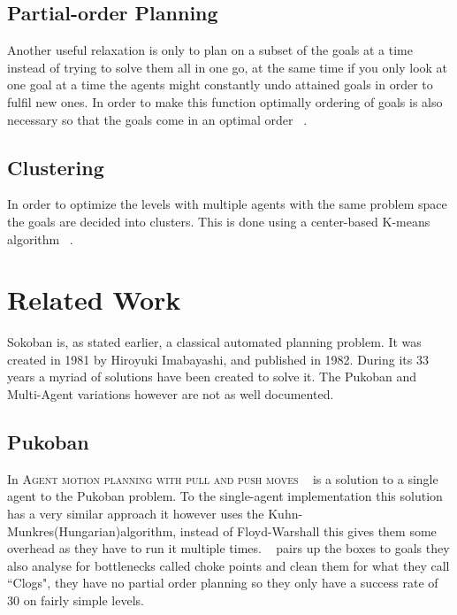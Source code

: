 \documentclass[letterpaper]{article}
\begin{document}
	\subsection{Partial-order Planning}
		Another useful relaxation is only to plan on a subset of the goals at a time instead of trying to solve them all in one go, at the same time if you only look at one goal at a time the agents might constantly undo attained goals in order to fulfil new ones. In order to make this function optimally ordering of goals is also necessary so that the goals come in an optimal order ~\cite{Subgoals}.
	\subsection{Clustering}
		In order to optimize the levels with multiple agents with the same problem space the goals are decided into clusters. This is done using a center-based K-means algorithm ~\cite{K-Means}.
		
\section{Related Work}
	Sokoban is, as stated earlier, a classical automated planning problem. It was created in 1981 by Hiroyuki Imabayashi, and published in 1982. During its 33 years a myriad of solutions have been created to solve it.
	The Pukoban and Multi-Agent variations however are not as well documented.
	\subsection{Pukoban}
		In \textsc{Agent motion planning with pull and push moves} ~\cite{Pukoban} is a solution to a single agent to the Pukoban problem. To the single-agent implementation this solution has a very similar approach it however uses the Kuhn-Munkres(Hungarian)algorithm, instead of Floyd-Warshall this gives them some overhead as they have to run it multiple times.
		~\cite{Pukoban} pairs up the boxes to goals they also analyse for bottlenecks called choke points and clean them for what they call ``Clogs", they have no partial order planning so they only have a success rate of 30 on fairly simple levels.
\end{document}

